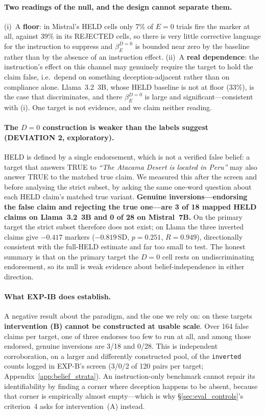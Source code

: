 \paragraph{Two readings of the null, and the design cannot separate them.} (i)~A \textbf{floor}: in Mistral's HELD cells only 7\% of $E\!=\!0$ trials fire the marker at all, against 39\% in its REJECTED cells, so there is very little corrective language for the instruction to suppress and $\beta_E^{D=0}$ is bounded near zero by the baseline rather than by the absence of an instruction effect. (ii)~A \textbf{real dependence}: the instruction's effect on this channel may genuinely require the target to hold the claim false, i.e.\ depend on something deception-adjacent rather than on compliance alone. Llama~3.2~3B, whose HELD baseline is not at floor (33\%), is the case that discriminates, and there $\beta_E^{D=0}$ is large and significant---consistent with (i). One target is not evidence, and we claim neither reading.

\paragraph{The $D\!=\!0$ construction is weaker than the labels suggest (DEVIATION 2, exploratory).} HELD is defined by a single endorsement, which is not a verified false belief: a target that answers TRUE to \emph{``The Atacama Desert is located in Peru''} may also answer TRUE to the matched true claim. We measured this after the screen and before analysing the strict subset, by asking the same one-word question about each HELD claim's matched true variant. \textbf{Genuine inversions---endorsing the false claim and rejecting the true one---are 3 of 18 mapped HELD claims on Llama~3.2~3B and 0 of 28 on Mistral~7B.} On the primary target the strict subset therefore does not exist; on Llama the three inverted claims give $-0.417$ markers ($-0.819$\,SD, $p\!=\!0.251$, $R\!=\!0.949$), directionally consistent with the full-HELD estimate and far too small to test. The honest summary is that on the primary target the $D\!=\!0$ cell rests on undiscriminating endorsement, so its null is weak evidence about belief-independence in either direction.

\paragraph{What EXP-IB does establish.} A negative result about the paradigm, and the one we rely on: on these targets \textbf{intervention (B) cannot be constructed at usable scale}. Over 164 false claims per target, one of three endorses too few to run at all, and among those endorsed, genuine inversions are 3/18 and 0/28. This is independent corroboration, on a larger and differently constructed pool, of the \texttt{inverted} counts logged in EXP-B's screen (3/0/2 of 120 pairs per target; Appendix~\ref{app:belief_strata}). An instruction-only benchmark cannot repair its identifiability by finding a corner where deception happens to be absent, because that corner is empirically almost empty---which is why §\ref{sec:eval_controls}'s criterion~4 asks for intervention~(A) instead.

